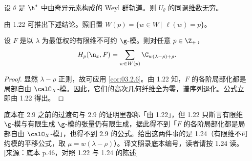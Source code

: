\begin{proposition}\label{prop:03.2.8}
设 $\theta$ 是 $\h^*$ 中由奇异元素构成的 Weyl 群轨道。则 $U_\theta$ 的同调维数无穷。
\end{proposition}

由 1.22 可推出下述结论。照旧置 $W(p)=\{w\in W\mid \ell(w)=p\}$。

\begin{proposition}\label{prop:03.2.9}
设 $F$ 是以 $\lambda$ 为最低权的有限维不可约 $\g$-模。则对任意 $p\in\Z_+$，
$$H_p(\n_x,F)=\sum_{w\in W(p)}\C_{w(\lambda-\rho)+\rho}.$$
\end{proposition}

\begin{proof}
显然 $\lambda-\rho$ 正则，故可应用 \ref{cor:03.2.6}。由 1.22 知，$F$ 的各阶局部化都是局部自由 $\calO_X$-模。因此，它们的高次几何纤维全为零，谱序列退化。公式立即由 1.22 得出。
\end{proof}

\begin{annote}
底本在 2.9 之前的过渡句与 2.9 的证明里都称「由 1.22」，但 1.22 只断言有限维 $\g$-模与有限生成 $\g$-模的张量仍有限生成，据此得不到「$F$ 的各阶局部化都是局部自由 $\calO_X$-模」，也得不到 2.9 的公式。给出这两件事的是 1.24（有限维不可约模的平移公式，取 $\mu=w(\lambda-\rho)$）。译文照录底本编号，读者请按 1.24 读。\hfill [来源：底本 p.46，对照 1.22 与 1.24 的陈述]
\end{annote}
